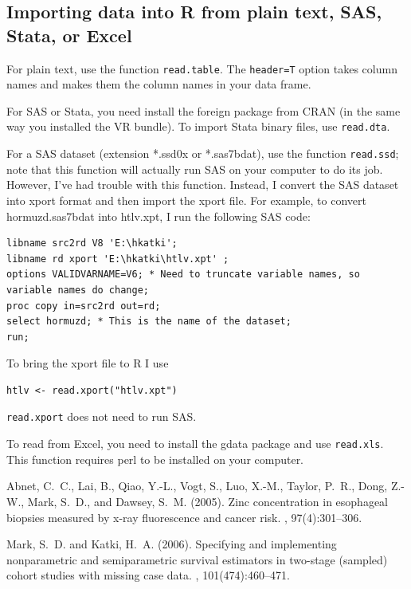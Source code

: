 \documentclass[10pt]{article}
\begin{document}
\subsection{Importing data into R from plain text, SAS, Stata, or Excel}
\label{sec:importing-data-into}

For plain text, use the function \texttt{read.table}.  The \texttt{header=T} option takes
column names and makes them the column names in your data frame.

For SAS or Stata, you need install the foreign package from CRAN (in the same way you
installed the VR bundle).  To import Stata binary files, use \texttt{read.dta}.

For a SAS dataset (extension *.ssd0x or *.sas7bdat), use the function \texttt{read.ssd};
note that this function will actually run SAS on your computer to do its job.  However,
I've had trouble with this function.  Instead, I convert the SAS dataset into xport format
and then import the xport file.  For example, to convert hormuzd.sas7bdat into
htlv.xpt, I run the following SAS code:
\begin{verbatim}
libname src2rd V8 'E:\hkatki';
libname rd xport 'E:\hkatki\htlv.xpt' ;
options VALIDVARNAME=V6; * Need to truncate variable names, so variable names do change;
proc copy in=src2rd out=rd;
select hormuzd; * This is the name of the dataset;
run;
\end{verbatim}
To bring the xport file to R I use
\begin{verbatim}
htlv <- read.xport("htlv.xpt")
\end{verbatim}
\texttt{read.xport} does not need to run SAS.

To read from Excel, you need to install the gdata package and use \texttt{read.xls}.  This
function requires perl to be installed on your computer.


\begin{thebibliography}{}

Abnet, C.~C., Lai, B., Qiao, Y.-L., Vogt, S., Luo, X.-M., Taylor, P.~R., Dong,
  Z.-W., Mark, S.~D., and Dawsey, S.~M. (2005).
\newblock Zinc concentration in esophageal biopsies measured by x-ray
  fluorescence and cancer risk.
, 97(4):301--306.

Mark, S.~D. and Katki, H.~A. (2006).
\newblock Specifying and implementing nonparametric and semiparametric survival
  estimators in two-stage (sampled) cohort studies with missing case data.
,
  101(474):460--471.

\end{thebibliography}
\end{document}
